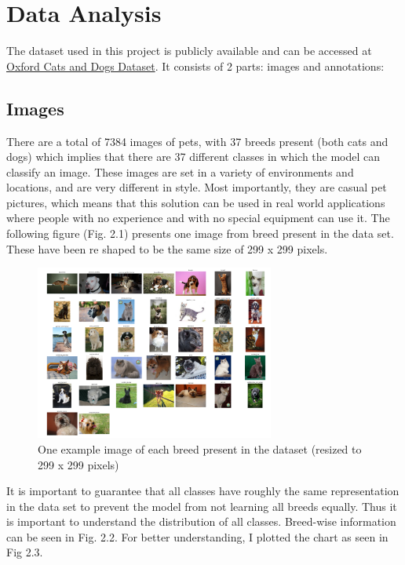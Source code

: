\chapter{Data Analysis}
\label{ch:lit_rev} 

The dataset used in this project is publicly available and can be accessed at \href{https://www.kaggle.com/datasets/zippyz/cats-and-dogs-breeds-classification-oxford-dataset}{Oxford Cats and Dogs Dataset}. It consists of 2 parts: images and annotations:

\section{Images} 
There are a total of 7384 images of pets, with 37 breeds
 present (both cats and dogs) which implies that there are 37 different classes in which the model can classify an image. These images are set in a variety of environments and locations, and are very different in style. Most importantly, they are casual pet pictures, which means that this solution can be used in real world applications where people with no experience and with no special equipment can use it.
 The following figure (Fig. 2.1) presents one image from breed present in the data set. These have been re shaped to be the same size of 299 x 299 pixels.\\   
\begin{figure}[h]
    \centering
    \includegraphics[width=0.7\textwidth]{figures/each_pic.png}
    \caption{One example image of each breed present in the dataset (resized to 299 x 299 pixels)}
    \label{fig:example_images}
\end{figure}
\noindent
It is important to guarantee that all classes have roughly the same representation in the data set to prevent the model from not learning all breeds equally. Thus it is important to understand the distribution of all classes. Breed-wise information can be seen in Fig. 2.2. For better understanding, I plotted the chart as seen in Fig 2.3.

